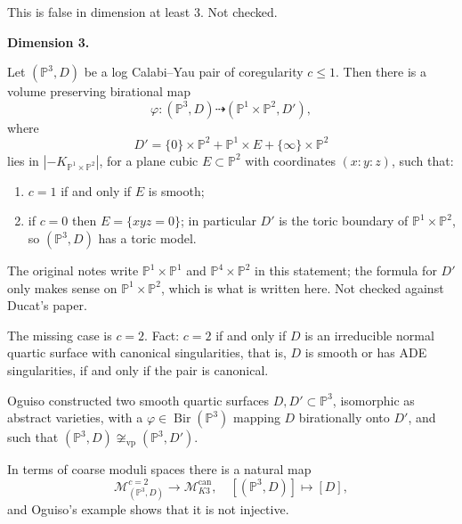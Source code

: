 This is false in dimension at least $3$.
Not checked.

\medskip\noindent
{\bf Dimension 3.}

\begin{theorem}[Ducat, 2023]
\label{theorem-alves-ducat}
Let $(\mathbb{P}^3,D)$ be a log Calabi--Yau
pair of coregularity $c\leq 1$. Then there
is a volume preserving birational map
$$
\varphi\colon (\mathbb{P}^3,D)
\dashrightarrow
(\mathbb{P}^1\times\mathbb{P}^2,D'),
$$
where
$$
D'=\{0\}\times\mathbb{P}^2
+\mathbb{P}^1\times E
+\{\infty\}\times\mathbb{P}^2
$$
lies in
$|-K_{\mathbb{P}^1\times\mathbb{P}^2}|$, for
a plane cubic $E\subset\mathbb{P}^2$ with
coordinates $(x:y:z)$, such that:
\begin{enumerate}
\item $c=1$ if and only if $E$ is smooth;
\item if $c=0$ then $E=\{xyz=0\}$; in
particular $D'$ is the toric boundary of
$\mathbb{P}^1\times\mathbb{P}^2$, so
$(\mathbb{P}^3,D)$ has a toric model.
\end{enumerate}
\end{theorem}

The original notes write
$\mathbb{P}^1\times\mathbb{P}^1$ and
$\mathbb{P}^4\times\mathbb{P}^2$ in this
statement; the formula for $D'$ only makes
sense on $\mathbb{P}^1\times\mathbb{P}^2$,
which is what is written here. Not checked
against Ducat's paper.

The missing case is $c=2$. Fact: $c=2$ if
and only if $D$ is an irreducible normal
quartic surface with canonical
singularities, that is, $D$ is smooth or
has ADE singularities, if and only if the
pair is canonical.

\begin{example}[Oguiso]
\label{example-alves-oguiso}
Oguiso constructed two smooth quartic
surfaces $D,D'\subset\mathbb{P}^3$,
isomorphic as abstract varieties, with a
$\varphi\in\operatorname{Bir}(\mathbb{P}^3)$
mapping $D$ birationally onto $D'$, and
such that
$(\mathbb{P}^3,D)
\not\cong_{\operatorname{vp}}
(\mathbb{P}^3,D')$.
\end{example}

In terms of coarse moduli spaces there is a
natural map
$$
\mathcal{M}^{c=2}_{(\mathbb{P}^3,D)}
\longrightarrow
\mathcal{M}^{\operatorname{can}}_{K3},
\quad
[(\mathbb{P}^3,D)]\longmapsto [D],
$$
and Oguiso's example shows that it is not
injective.

